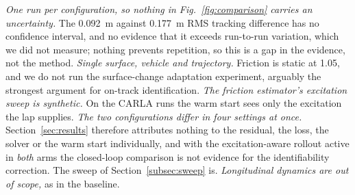 \emph{One run per configuration, so nothing in Fig.~\ref{fig:comparison}
carries an uncertainty.} The \SI{0.092}{\meter} against \SI{0.177}{\meter} RMS
tracking difference has no confidence interval, and no evidence that it exceeds
run-to-run variation, which we did not measure; nothing prevents repetition, so
this is a gap in the evidence, not the method. \emph{Single surface, vehicle
and trajectory.} Friction is static at \num{1.05}, and we do not run the
surface-change adaptation experiment, arguably the strongest argument for
on-track identification. \emph{The friction estimator's excitation sweep is
synthetic.} On the CARLA runs the warm start sees only the excitation the lap
supplies. \emph{The two configurations differ in four settings at once.}
Section~\ref{sec:results} therefore attributes nothing to the residual, the
loss, the solver or the warm start individually, and with the excitation-aware
rollout active in \emph{both} arms the closed-loop comparison is not evidence
for the identifiability correction. The sweep of
Section~\ref{subsec:sweep} is. \emph{Longitudinal dynamics are
out of scope,} as in the baseline.
